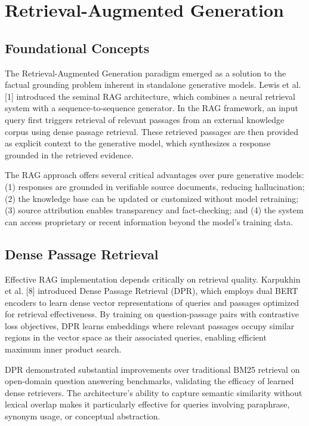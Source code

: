 \section{Retrieval-Augmented Generation}

\subsection{Foundational Concepts}

The Retrieval-Augmented Generation paradigm emerged as a solution to the factual grounding problem inherent in standalone generative models. Lewis et al. [1] introduced the seminal RAG architecture, which combines a neural retrieval system with a sequence-to-sequence generator. In the RAG framework, an input query first triggers retrieval of relevant passages from an external knowledge corpus using dense passage retrieval. These retrieved passages are then provided as explicit context to the generative model, which synthesizes a response grounded in the retrieved evidence.

The RAG approach offers several critical advantages over pure generative models: (1) responses are grounded in verifiable source documents, reducing hallucination; (2) the knowledge base can be updated or customized without model retraining; (3) source attribution enables transparency and fact-checking; and (4) the system can access proprietary or recent information beyond the model's training data.

\subsection{Dense Passage Retrieval}

Effective RAG implementation depends critically on retrieval quality. Karpukhin et al. [8] introduced Dense Passage Retrieval (DPR), which employs dual BERT encoders to learn dense vector representations of queries and passages optimized for retrieval effectiveness. By training on question-passage pairs with contrastive loss objectives, DPR learns embeddings where relevant passages occupy similar regions in the vector space as their associated queries, enabling efficient maximum inner product search.

DPR demonstrated substantial improvements over traditional BM25 retrieval on open-domain question answering benchmarks, validating the efficacy of learned dense retrievers. The architecture's ability to capture semantic similarity without lexical overlap makes it particularly effective for queries involving paraphrase, synonym usage, or conceptual abstraction.


